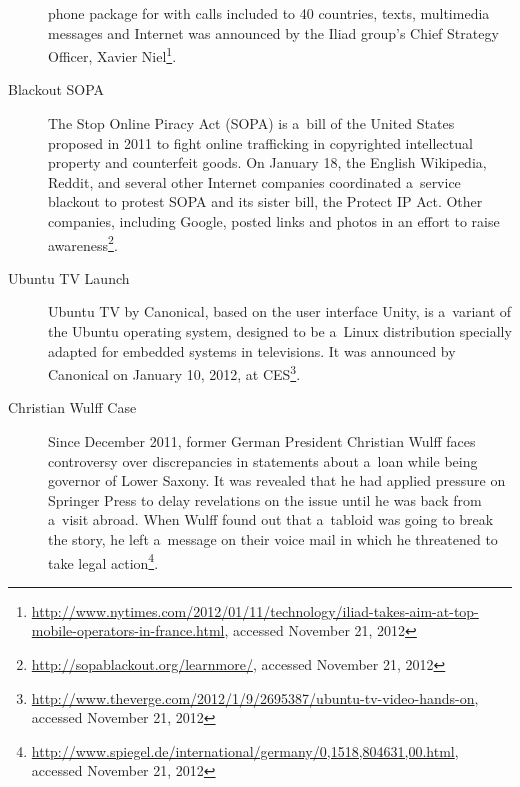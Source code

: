 \begin{description}
       phone package for  with calls included to 40
       countries, texts, multimedia messages and Internet was
       announced by the Iliad group's Chief Strategy Officer,
       Xavier
       Niel\footnote{\url{http://www.nytimes.com/2012/01/11/technology/iliad-takes-aim-at-top-mobile-operators-in-france.html},
       accessed November 21, 2012}.
  \item[Blackout SOPA]
       The Stop Online Piracy Act (SOPA) is a~bill of the United
       States proposed in 2011 to fight online trafficking in
       copyrighted intellectual property and counterfeit goods.
       On January 18, the English Wikipedia, Reddit, and several
       other Internet companies coordinated a~service blackout
       to protest SOPA and its sister bill, the Protect IP Act.
       Other companies, including Google, posted links and
       photos in an effort to raise
       awareness\footnote{\url{http://sopablackout.org/learnmore/},
       accessed November 21, 2012}.
  \item[Ubuntu TV Launch]
       Ubuntu TV by Canonical, based on the user interface Unity,
       is a~variant of the Ubuntu operating system, designed to be
       a~Linux distribution specially adapted for embedded systems
       in televisions. It was announced by Canonical on January
       10, 2012, at
       CES\footnote{\url{http://www.theverge.com/2012/1/9/2695387/ubuntu-tv-video-hands-on},
       accessed November 21, 2012}.
  \item[Christian Wulff Case]
       Since December 2011, former German President Christian
       Wulff faces controversy over discrepancies in statements
       about a~loan while being governor of Lower Saxony.
       It was revealed that he had applied pressure
       on Springer Press to delay revelations on the issue until
       he was back from a~visit abroad. When Wulff found out that
       a~tabloid was going to break the story, he left a~message
       on their voice mail in which he threatened to take legal
       action\footnote{\url{http://www.spiegel.de/international/germany/0,1518,804631,00.html},
       accessed November 21, 2012}.
\end{description}


